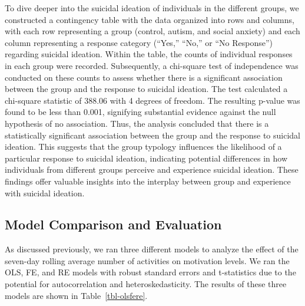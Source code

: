 \documentclass[
  letterpaper,
  number,
  review,
  3p]{elsarticle}
\begin{document}
To dive deeper into the suicidal ideation of individuals in the
different groups, we constructed a contingency table with the data
organized into rows and columns, with each row representing a group
(control, autism, and social anxiety) and each column representing a
response category (``Yes,'' ``No,'' or ``No Response'') regarding
suicidal ideation. Within the table, the counts of individual responses
in each group were recorded. Subsequently, a chi-square test of
independence was conducted on these counts to assess whether there is a
significant association between the group and the response to suicidal
ideation. The test calculated a chi-square statistic of 388.06 with 4
degrees of freedom. The resulting p-value was found to be less than
0.001, signifying substantial evidence against the null hypothesis of no
association. Thus, the analysis concluded that there is a statistically
significant association between the group and the response to suicidal
ideation. This suggests that the group typology influences the
likelihood of a particular response to suicidal ideation, indicating
potential differences in how individuals from different groups perceive
and experience suicidal ideation. These findings offer valuable insights
into the interplay between group and experience with suicidal ideation.

\subsection{Model Comparison and
Evaluation}\label{model-comparison-and-evaluation}

As discussed previously, we ran three different models to analyze the
effect of the seven-day rolling average number of activities on
motivation levels. We ran the OLS, FE, and RE models with robust
standard errors and t-statistics due to the potential for
autocorrelation and heteroskedasticity. The results of these three
models are shown in Table~\ref{tbl-olsfere}.
\end{document}
